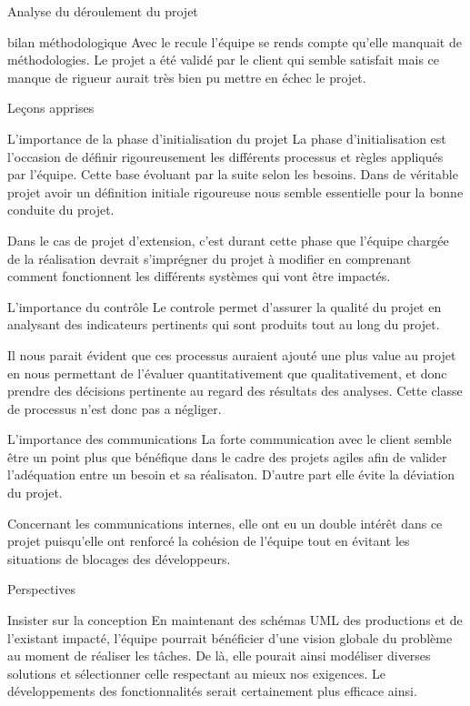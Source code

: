\documentclass[]{article}
\begin{document}
{\begin{section}{Analyse du déroulement du projet}
\begin{subsection}{bilan méthodologique}
     Avec le recule l'équipe se rends compte qu'elle manquait de méthodologies. Le projet a été validé par le client qui semble satisfait mais ce manque de rigueur aurait très bien pu mettre en échec le projet.
 \end{subsection}
\end{section}

\begin{section}{Leçons apprises}
 \begin{subsection}{L'importance de la phase d'initialisation du projet}
     La phase d'initialisation est l'occasion de définir rigoureusement les différents processus et règles appliqués par l'équipe. Cette base évoluant par la suite selon les besoins. Dans de véritable projet avoir un définition initiale rigoureuse nous semble essentielle pour la bonne conduite du projet.

     Dans le cas de projet d'extension, c'est durant cette phase que l'équipe chargée de la réalisation devrait s'imprégner du projet à modifier en comprenant comment fonctionnent les différents systèmes qui vont être impactés.
 \end{subsection}

 \begin{subsection}{L'importance du contrôle}
     Le controle permet d'assurer la qualité du projet en analysant des indicateurs pertinents qui sont produits tout au long du projet.

     Il nous parait évident que ces processus auraient ajouté une plus value au projet en nous permettant de l'évaluer quantitativement que qualitativement, et donc prendre des décisions pertinente au regard des résultats des analyses. Cette classe de processus n'est donc pas a négliger.
 \end{subsection}

 \begin{subsection}{L'importance des communications}
     La forte communication avec le client semble être un point plus que bénéfique dans le cadre des projets agiles afin de valider l'adéquation entre un besoin et sa réalisaton. D'autre part elle évite la déviation du projet.

     Concernant les communications internes, elle ont eu un double intérêt dans ce projet puisqu'elle ont renforcé la cohésion de l'équipe tout en évitant les situations de blocages des développeurs.
 \end{subsection}
\end{section}

\begin{section}{Perspectives}
 \begin{subsection}{Insister sur la conception}
     En maintenant des schémas UML des productions et de l'existant impacté, l'équipe pourrait bénéficier d'une vision globale du problème au moment de réaliser les tâches. De là, elle pourait ainsi modéliser diverses solutions et sélectionner celle respectant au mieux nos exigences. Le développements des fonctionnalités serait certainement plus efficace ainsi.
 \end{subsection}


\end{section}}
\end{document}
